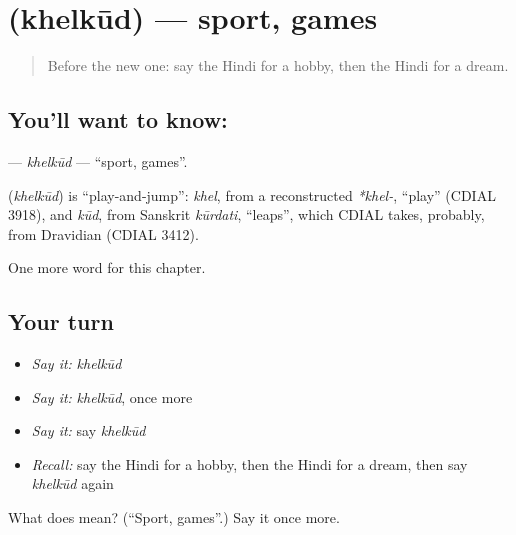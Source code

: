 \section[\texorpdfstring{\hi{खेलकूद} (khelkūd)}{खेलकूद (khelkūd)}]{ (khelkūd) — sport, games}

\label{lesson:HI-C223-khelkud}



\begin{quote}
Before the new one: say the Hindi for a hobby, then the Hindi for a dream.
\end{quote}

\subsection*{You'll want to know: }
\textbf{} — \emph{khelkūd} — \textquotedblleft{}sport, games\textquotedblright{}.

\begin{cousinweb}
\textbf{} (\emph{khelkūd}) is \textquotedblleft{}play-and-jump\textquotedblright{}: \emph{khel}, from a reconstructed \emph{*khel-}, \textquotedblleft{}play\textquotedblright{} (CDIAL 3918), and \emph{kūd}, from Sanskrit \emph{kūrdati}, \textquotedblleft{}leaps\textquotedblright{}, which CDIAL takes, probably, from Dravidian (CDIAL 3412).
\end{cousinweb}

\begin{grammarlens}[title={What you've built}]
One more word for this chapter.
\end{grammarlens}

\subsection*{Your turn}
\begin{itemize}
\raggedright
  \item \emph{Say it:} \emph{khelkūd}
  \item \emph{Say it:} \emph{khelkūd}, once more
  \item \emph{Say it:} say \emph{khelkūd}
  \item \emph{Recall:} say the Hindi for a hobby, then the Hindi for a dream, then say \emph{khelkūd} again
\end{itemize}

\begin{tcolorbox}[breakable,colback=teal!4,colframe=teal!35!black,title={Before you move on}]
What does  mean? (\textquotedblleft{}Sport, games\textquotedblright{}.) Say it once more.
\end{tcolorbox}
